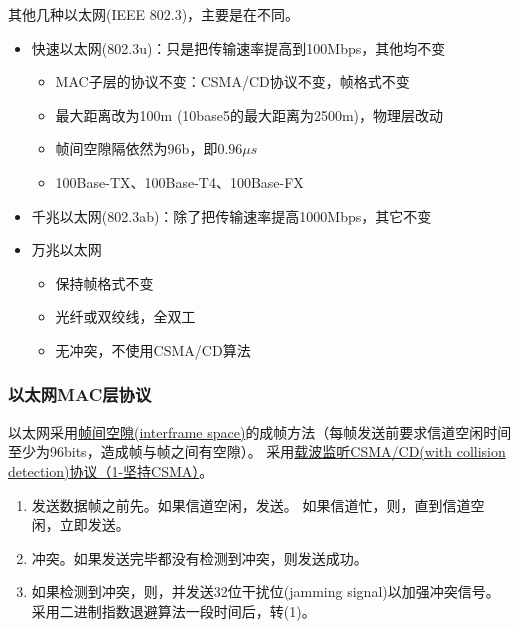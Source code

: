 \myhline
其他几种以太网(IEEE 802.3)，主要是在不同。
\begin{itemize}
\item 快速以太网(802.3u)：只是把传输速率提高到100Mbps，其他均不变
\begin{itemize}
	\item MAC子层的协议不变：CSMA/CD协议不变，帧格式不变
	\item 最大距离改为100m (10base5的最大距离为2500m)，物理层改动
	\item 帧间空隙隔依然为96b，即$0.96\mu s$
	\item 100Base-TX、100Base-T4、100Base-FX
\end{itemize}
\item 千兆以太网(802.3ab)：除了把传输速率提高1000Mbps，其它不变
\item 万兆以太网
\begin{itemize}
	\item 保持帧格式不变
	\item 光纤或双绞线，全双工
	\item 无冲突，不使用CSMA/CD算法
\end{itemize}
\end{itemize}

\subsubsection{以太网MAC层协议}
以太网采用\underline{帧间空隙(interframe space)}的成帧方法（每帧发送前要求信道空闲时间至少为96bits，造成帧与帧之间有空隙）。
采用\underline{载波监听CSMA/CD(with collision detection)协议（1-坚持CSMA）}。
\begin{enumerate}
	\item 发送数据帧之前先。如果信道空闲，发送。
	如果信道忙，则，直到信道空闲，立即发送。
	\item {}冲突。如果发送完毕都没有检测到冲突，则发送成功。
	\item 如果检测到冲突，则，并发送32位干扰位(jamming signal)以加强冲突信号。
	采用二进制指数退避算法一段时间后，转(1)。
\end{enumerate}

